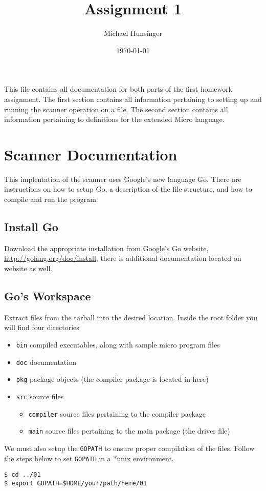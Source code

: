\documentclass[11pt]{article}
\author{Michael Hunsinger}
\date{\today}
\title{Assignment 1}
\begin{document}
\maketitle
This file contains all documentation for both parts of the first homework
assignment. The first section contains all information pertaining to
setting up and running the scanner operation on a file. The second section
contains all information pertaining to definitions for the extended Micro
language.

\section{Scanner Documentation}
\label{sec-1}
This implentation of the scanner uses Google's new language Go. There are
instructions on how to setup Go, a description of the file structure, and
how to compile and run the program.

\subsection{Install Go}
\label{sec-1-1}
Download the appropriate installation from Google's Go website,
\url{http://golang.org/doc/install}, there is additional documentation located
on website as well.

\subsection{Go's Workspace}
\label{sec-1-2}
Extract files from the tarball into the desired location. Inside the root
folder you will find four directories
\begin{itemize}
\item \texttt{bin} compiled executables, along with sample micro program files
\item \texttt{doc} documentation
\item \texttt{pkg} package objects (the compiler package is located in here)
\item \texttt{src} source files
\begin{itemize}
\item \texttt{compiler} source files pertaining to the compiler package
\item \texttt{main} source files pertaining to the main package (the driver file)
\end{itemize}
\end{itemize}

We must also setup the \texttt{GOPATH} to ensure proper compilation of the files.
Follow the steps below to set \texttt{GOPATH} in a *unix environment. 
\begin{verbatim}
$ cd ../01
$ export GOPATH=$HOME/your/path/here/01
\end{verbatim}
\end{document}
